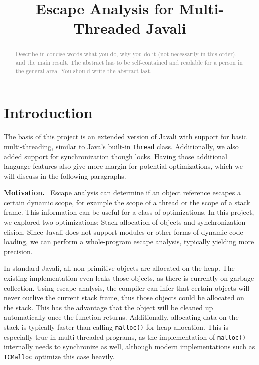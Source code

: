 \documentclass[letterpaper]{article}
\title{Escape Analysis for Multi-Threaded Javali}
\newcommand{\mypar}[1]{{\bf #1.}}
\begin{document}
%
\maketitle
%

\begin{abstract}
\textcolor{gray}{
Describe in concise words what you do, why you do it (not necessarily
in this order), and the main result.  The abstract has to be
self-contained and readable for a person in the general area. You
should write the abstract last. }
\end{abstract}

\section{Introduction}\label{sec:intro}

The basis of this project is an extended version of Javali with support for
basic multi-threading, similar to Java's built-in \texttt{Thread} class. 
Additionally, we also added support for synchronization though locks. Having
those additional language features also give more margin for potential
optimizations, which we will discuss in the following paragraphs.

\mypar{Motivation} \
Escape analysis can determine if an object reference escapes a certain dynamic
scope, for example the scope of a thread or the scope of a stack frame. This
information can be useful for a class of optimizations. In this project, we
explored two optimizations: Stack allocation of objects and synchronization
elision. Since Javali does not support modules or other forms of dynamic code
loading, we can perform a whole-program escape analysis, typically yielding more
precision.

In standard Javali, all non-primitive objects are allocated on the heap. The
existing implementation even leaks those objects, as there is currently on
garbage collection. Using escape analysis, the compiler can infer that certain
objects will never outlive the current stack frame, thus those objects could
be allocated on the stack. This has the advantage that the object will be cleaned
up automatically once the function returns. Additionally, allocating data on the
stack is typically faster than calling \texttt{malloc()} for heap allocation.
This is especially true in multi-threaded programs, as the implementation of
\texttt{malloc()} internally needs to synchronize as well, although modern
implementations such as \texttt{TCMalloc} \cite{TCMalloc} optimize this case heavily.
\end{document}
